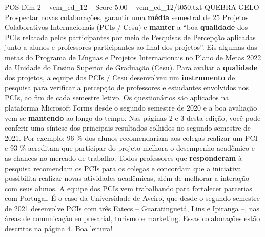 \begin{textsample}{POS Dim 2 – vem\_ed\_12 – Score 5.00 – vem\_ed\_12/t050.txt}  \label{ex:f2_pos_106}
QUEBRA-GELO Prospectar novas colaborações, garantir uma \textbf{média} semestral de 25 Projetos Colaborativos Internacionais (PCIs / Cesu) e \textbf{manter} a “boa \textbf{qualidade} dos PCIs relatada pelos participantes por meio de Pesquisas de Percepção aplicadas junto a alunos e professores participantes ao final dos projetos”.
Eis algumas das metas do Programa de Línguas e Projetos Internacionais no Plano de Metas 2022 da Unidade do Ensino Superior de Graduação (Cesu).
Para avaliar a \textbf{qualidade} dos projetos, a equipe dos PCIs / Cesu desenvolveu um \textbf{instrumento} de pesquisa para verificar a percepção de professores e estudantes envolvidos nos PCIs, ao fim de cada semestre letivo.
Os questionários são aplicados na plataforma Microsoft Forms desde o segundo semestre de 2020 e a boa avaliação vem se \textbf{mantendo} ao longo do tempo.
Nas páginas 2 e 3 desta edição, você pode conferir uma síntese dos principais resultados colhidos no segundo semestre de 2021.
Por exemplo: 96 \% dos alunos recomendariam aos colegas realizar um PCI e 93 \% acreditam que participar do projeto melhora o desempenho acadêmico e as chances no mercado de trabalho.
Todos professores que \textbf{responderam} à pesquisa recomendam os PCIs para os colegas e concordam que a iniciativa possibilita realizar novas atividades acadêmicas, além de melhorar a interação com seus alunos.
A equipe dos PCIs vem trabalhando para fortalecer parcerias com Portugal.
É o caso da Universidade de Aveiro, que desde o segundo semestre de 2021 desenvolve PCIs com três Fatecs – Guaratinguetá, Lins e Ipiranga –, nas áreas de comunicação empresarial, turismo e marketing.
Essas colaborações estão descritas na página 4.
Boa leitura!

\end{textsample}
